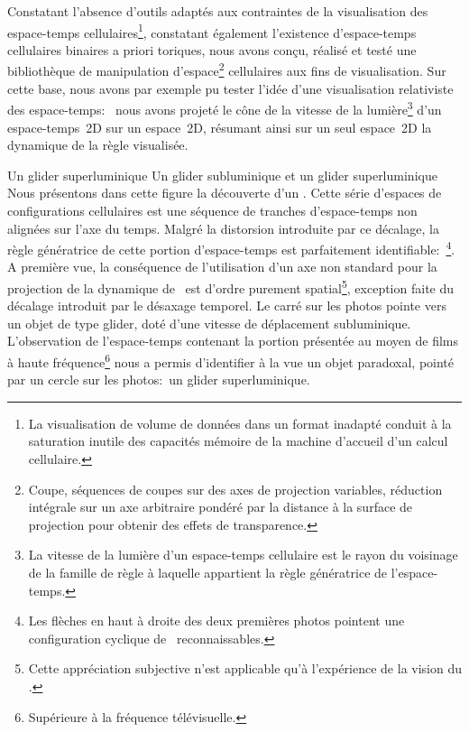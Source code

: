 Constatant l'absence d'outils adapt\'es aux contraintes de la
visualisation des espace-temps cellulaires\footnote{%
  La visualisation de volume de donn\'ees dans un format inadapt\'e
  conduit \`a la saturation inutile des capacit\'es m\'emoire de la machine
  d'accueil d'un calcul cellulaire.}, %
constatant \'egalement l'existence d'espace-temps cellulaires binaires a
priori toriques, nous avons con\c{c}u, r\'ealis\'e et test\'e une biblioth\`eque
de manipulation d'espace\footnote{%
  Coupe, s\'equences de coupes sur des axes de projection variables, %
  r\'eduction int\'egrale sur un axe arbitraire pond\'er\'e par la distance \`a
  la surface de projection pour obtenir des effets de transparence.} %
cellulaires aux fins de visualisation. %
Sur cette base, nous avons par exemple pu tester l'id\'ee d'une
visualisation relativiste des espace-temps:~%
nous avons projet\'e le c\^one de la vitesse de la lumi\`ere\footnote{%
  La vitesse de la lumi\`ere d'un espace-temps cellulaire est le rayon
  du voisinage de la famille de r\`egle \`a laquelle appartient la r\`egle
  g\'en\'eratrice de l'espace-temps.} %
d'un espace-temps~2D sur un espace~2D, r\'esumant ainsi sur un seul
espace~2D la dynamique de la r\`egle visualis\'ee.

%
{Un glider superluminique}%
{Un glider subluminique et un glider superluminique}%
{Nous pr\'esentons dans cette figure la d\'ecouverte
  d'un . %
  Cette s\'erie d'espaces de configurations cellulaires est une s\'equence
  de tranches d'espace-temps non align\'ees sur l'axe du temps. %
  Malgr\'e la distorsion introduite par ce d\'ecalage, la r\`egle
  g\'en\'eratrice de cette portion d'espace-temps est
  parfaitement identifiable:~\footnote{%
    Les fl\`eches en haut \`a droite des deux premi\`eres photos pointent
    une configuration cyclique de~ reconnaissables.}. %
  A premi\`ere vue, la cons\'equence de l'utilisation d'un axe non
  standard pour la projection de la dynamique de~ est
  d'ordre purement spatial\footnote{%
    Cette appr\'eciation subjective n'est applicable qu'\`a l'exp\'erience
    de la vision du .}, %
  exception faite du d\'ecalage introduit par le d\'esaxage temporel. %
  Le carr\'e sur les photos pointe vers un objet  de type
  glider, dot\'e d'une vitesse de d\'eplacement subluminique. %
  L'observation de l'espace-temps contenant la portion pr\'esent\'ee au
  moyen de films \`a haute fr\'equence\footnote{%
    Sup\'erieure \`a la fr\'equence t\'el\'evisuelle.} %
  nous a permis d'identifier \`a la vue un objet paradoxal, point\'e par
  un cercle sur les photos:~un glider superluminique.}

